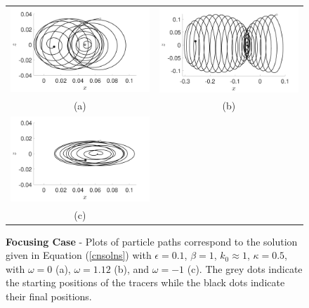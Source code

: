 \documentclass{JFM_Style/jfm}
\begin{document}
\begin{figure}
\centering
\begin{tabular}{cc}
\includegraphics[width=.48\textwidth]{track_ep_pt1_tf_1_w_0_kap_pt5_foc} & \includegraphics[width=.48\textwidth]{track_ep_pt1_tf_1_w_1pt12_kap_pt5_foc} \\
(a) & (b) \\ 
\includegraphics[width=.48\textwidth]{track_ep_pt1_tf_1_w_n1_kap_pt5_foc} & \\
(c) & 
\end{tabular}
\caption{\small {\bf Focusing Case} - Plots of particle paths correspond to the solution given in Equation (\ref{cnsolns}) with $\epsilon=0.1$, $\beta=1$, $k_{0}\approx 1$, $\kappa=0.5$, with $\omega=0$ (a), $\omega=1.12$ (b), and $\omega=-1$ (c). The grey dots indicate the starting positions of the tracers while the black dots indicate their final positions.}
\label{fig:foc_kap_pt5}
\end{figure}
\end{document}
